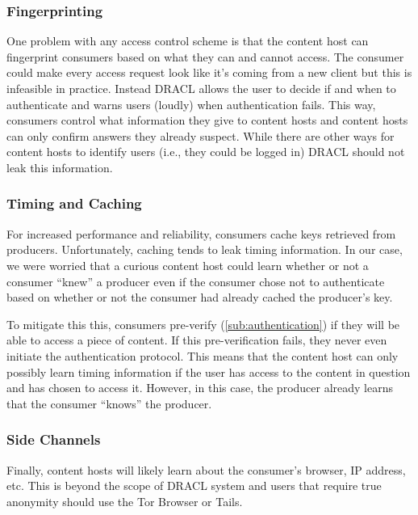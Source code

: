 \documentclass[pdftex,12pt,a4papaer,twoside,notitlepage]{report}
\begin{document}
\subsubsection{Fingerprinting}
\label{sub:fingerprinting}

One problem with any access control scheme is that the content host can
fingerprint consumers based on what they can and cannot access. The consumer
could make every access request look like it's coming from a new client but this
is infeasible in practice. Instead DRACL allows the user to decide if and when
to authenticate and warns users (loudly) when authentication fails. This way,
consumers control what information they give to content hosts and content hosts
can only confirm answers they already suspect. While there are other ways for
content hosts to identify users (i.e., they could be logged in) DRACL should not
leak this information.

\subsubsection{Timing and Caching}
\label{sub:timing}

For increased performance and reliability, consumers cache keys retrieved from
producers. Unfortunately, caching tends to leak timing information. In our
case, we were worried that a curious content host could learn whether or not a
consumer ``knew'' a producer even if the consumer chose not to authenticate
based on whether or not the consumer had already cached the producer's key.

To mitigate this this, consumers pre-verify (\cref{sub:authentication}) if they
will be able to access a piece of content. If this pre-verification fails, they
never even initiate the authentication protocol. This means that the content
host can only possibly learn timing information if the user has access to the
content in question and has chosen to access it. However, in this case, the
producer already learns that the consumer ``knows'' the producer.

\subsubsection{Side Channels}

Finally, content hosts will likely learn about the consumer's browser, IP
address, etc. This is beyond the scope of DRACL system and users that require
true anonymity should use the Tor Browser\cite{tor} or Tails\cite{tails}.
\end{document}
